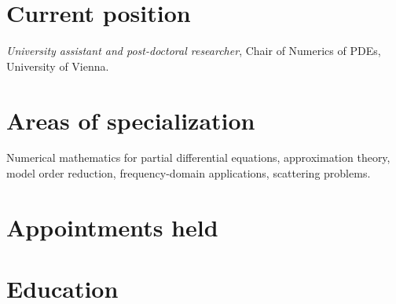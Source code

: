 \documentclass[11pt]{article} %
\begin{document}

\medskip %

\section*{Current position}

\emph{University assistant and post-doctoral researcher}, Chair of Numerics of PDEs, University of Vienna. %


\section*{Areas of specialization}

Numerical mathematics for partial differential equations, approximation theory, model order reduction, frequency-domain applications, scattering problems.


\section*{Appointments held}\startseclist







\section*{Education}\startseclist
\end{document}
